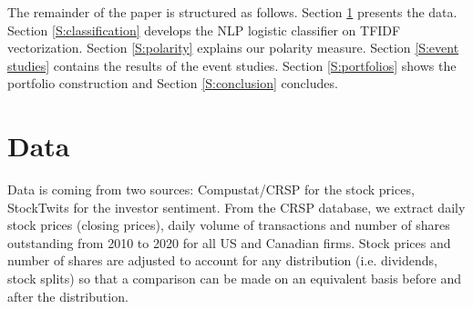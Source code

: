 The remainder of the paper is structured as follows. Section \ref{S:data} presents the data. Section \ref{S:classification} develops the NLP logistic classifier on TFIDF vectorization. Section \ref{S:polarity} explains our polarity measure. Section \ref{S:event studies} contains the results of the event studies. Section \ref{S:portfolios} shows the portfolio construction and Section \ref{S:conclusion} concludes.


\section{Data}
\label{S:data}

Data is coming from two sources: Compustat/CRSP for the stock prices, StockTwits for the investor sentiment. From the CRSP database, we extract daily stock prices (closing prices), daily volume of transactions and number of shares outstanding from 2010 to 2020 for all US and Canadian firms. Stock prices and number of shares are adjusted to account for any distribution (i.e. dividends, stock splits) so that a comparison can be made on an equivalent basis before and after the distribution. 

